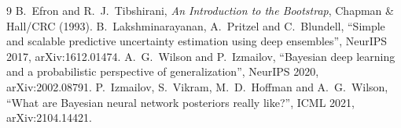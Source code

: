 \documentclass[11pt]{article}
\begin{document}
\begin{thebibliography}{9}
 B.~Efron and R.~J.~Tibshirani, \emph{An Introduction to the
  Bootstrap}, Chapman \& Hall/CRC (1993).
 B.~Lakshminarayanan, A.~Pritzel and C.~Blundell, ``Simple
  and scalable predictive uncertainty estimation using deep ensembles'', NeurIPS 2017,
  arXiv:1612.01474.
 A.~G.~Wilson and P.~Izmailov, ``Bayesian deep learning and a
  probabilistic perspective of generalization'', NeurIPS 2020, arXiv:2002.08791.
 P.~Izmailov, S.~Vikram, M.~D.~Hoffman and A.~G.~Wilson, ``What are
  Bayesian neural network posteriors really like?'', ICML 2021, arXiv:2104.14421.
\end{thebibliography}
\end{document}
